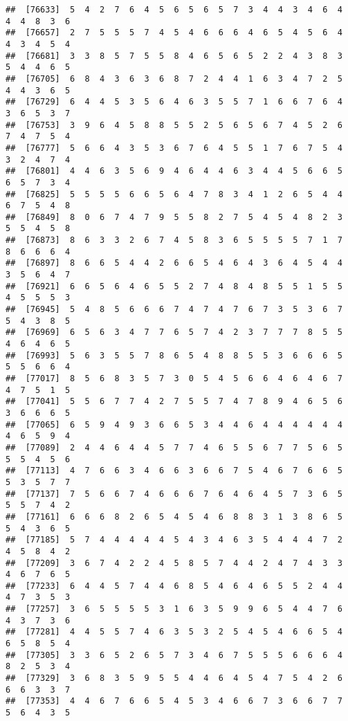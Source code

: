 \documentclass[
]{book}
\begin{document}
\begin{verbatim}
##  [76633]  5  4  2  7  6  4  5  6  5  6  5  7  3  4  4  3  4  6  4  4  4  8  3  6
##  [76657]  2  7  5  5  5  7  4  5  4  6  6  6  4  6  5  4  5  6  4  4  3  4  5  4
##  [76681]  3  3  8  5  7  5  5  8  4  6  5  6  5  2  2  4  3  8  3  5  4  4  6  5
##  [76705]  6  8  4  3  6  3  6  8  7  2  4  4  1  6  3  4  7  2  5  4  4  3  6  5
##  [76729]  6  4  4  5  3  5  6  4  6  3  5  5  7  1  6  6  7  6  4  3  6  5  3  7
##  [76753]  3  9  6  4  5  8  8  5  5  2  5  6  5  6  7  4  5  2  6  7  4  7  5  4
##  [76777]  5  6  6  4  3  5  3  6  7  6  4  5  5  1  7  6  7  5  4  3  2  4  7  4
##  [76801]  4  4  6  3  5  6  9  4  6  4  4  6  3  4  4  5  6  6  5  6  5  7  3  4
##  [76825]  5  5  5  5  6  6  5  6  4  7  8  3  4  1  2  6  5  4  4  6  7  5  4  8
##  [76849]  8  0  6  7  4  7  9  5  5  8  2  7  5  4  5  4  8  2  3  5  5  4  5  8
##  [76873]  8  6  3  3  2  6  7  4  5  8  3  6  5  5  5  5  7  1  7  8  6  6  6  4
##  [76897]  8  6  6  5  4  4  2  6  6  5  4  6  4  3  6  4  5  4  4  3  5  6  4  7
##  [76921]  6  6  5  6  4  6  5  5  2  7  4  8  4  8  5  5  1  5  5  4  5  5  5  3
##  [76945]  5  4  8  5  6  6  6  7  4  7  4  7  6  7  3  5  3  6  7  5  4  3  8  5
##  [76969]  6  5  6  3  4  7  7  6  5  7  4  2  3  7  7  7  8  5  5  4  6  4  6  5
##  [76993]  5  6  3  5  5  7  8  6  5  4  8  8  5  5  3  6  6  6  5  5  5  6  6  4
##  [77017]  8  5  6  8  3  5  7  3  0  5  4  5  6  6  4  6  4  6  7  4  7  5  1  5
##  [77041]  5  5  6  7  7  4  2  7  5  5  7  4  7  8  9  4  6  5  6  3  6  6  6  5
##  [77065]  6  5  9  4  9  3  6  6  5  3  4  4  6  4  4  4  4  4  4  4  6  5  9  4
##  [77089]  2  4  4  6  4  4  5  7  7  4  6  5  5  6  7  7  5  6  5  5  5  4  5  6
##  [77113]  4  7  6  6  3  4  6  6  3  6  6  7  5  4  6  7  6  6  5  5  3  5  7  7
##  [77137]  7  5  6  6  7  4  6  6  6  7  6  4  6  4  5  7  3  6  5  5  5  7  4  2
##  [77161]  6  6  6  8  2  6  5  4  5  4  6  8  8  3  1  3  8  6  5  5  4  3  6  5
##  [77185]  5  7  4  4  4  4  4  5  4  3  4  6  3  5  4  4  4  7  2  4  5  8  4  2
##  [77209]  3  6  7  4  2  2  4  5  8  5  7  4  4  2  4  7  4  3  3  4  6  7  6  5
##  [77233]  6  4  4  5  7  4  4  6  8  5  4  6  4  6  5  5  2  4  4  4  7  3  5  3
##  [77257]  3  6  5  5  5  5  3  1  6  3  5  9  9  6  5  4  4  7  6  4  3  7  3  6
##  [77281]  4  4  5  5  7  4  6  3  5  3  2  5  4  5  4  6  6  5  4  6  5  8  5  4
##  [77305]  3  3  6  5  2  6  5  7  3  4  6  7  5  5  5  6  6  6  4  8  2  5  3  4
##  [77329]  3  6  8  3  5  9  5  5  4  4  6  4  5  4  7  5  4  2  6  6  6  3  3  7
##  [77353]  4  4  6  7  6  6  5  4  5  3  4  6  6  7  3  6  6  7  7  5  6  4  3  5

\end{verbatim}
\end{document}
